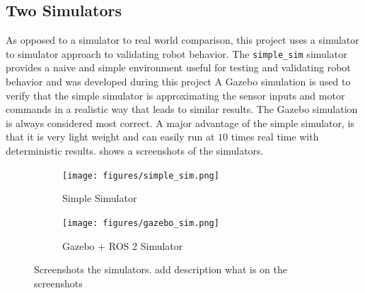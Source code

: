 \subsection{Two Simulators}
As opposed to a simulator to real world comparison, this project uses a simulator to simulator approach to validating robot behavior. The \texttt{simple\_sim} simulator provides a naive and simple environment useful for testing and validating robot behavior and was developed during this project A Gazebo simulation is used to verify that the simple simulator is approximating the sensor inputs and motor commands in a realistic way that leads to similar results. The Gazebo simulation is always considered most correct. A major advantage of the simple simulator, is that it is very light weight and can easily run at $10$ times real time with deterministic results.  shows a screenshots of the simulators.

\begin{figure}[h]
    \centering
    \begin{subfigure}[b]{0.45\textwidth}
        \centering
        \texttt{[image: figures/simple\_sim.png]}
        \caption{Simple Simulator}
    \end{subfigure}
    \hfill
    \begin{subfigure}[b]{0.45\textwidth}
        \centering
        \texttt{[image: figures/gazebo\_sim.png]}
        \caption{Gazebo + ROS 2 Simulator}
    \end{subfigure}
    \caption{Screenshots the simulators. {\color{red} add description what is on the screenshots}}
    \label{fig:simulators}
\end{figure}

